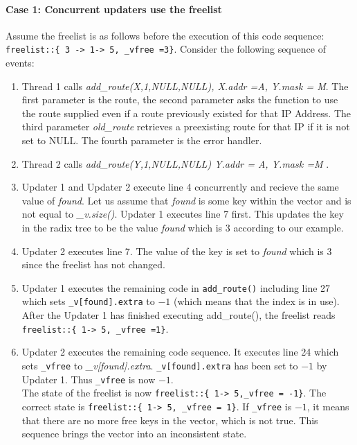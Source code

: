 \documentclass[12pt,a4paper]{article}
\begin{document}
\paragraph{Case 1: Concurrent updaters use the freelist}
Assume the freelist is as follows before the execution of this code sequence:\\
\verb$freelist::{ 3 -> 1-> 5, _vfree =3}$. Consider the following sequence of events:
\begin{enumerate}
\item Thread 1 calls \emph{add\_route(X,1,NULL,NULL), X.addr =A, Y.mask = M}. The first parameter is the route, the second parameter asks the function to use the route supplied even if a route previously existed for that IP Address. The third parameter \emph{old\_route} retrieves a preexisting route for that IP if it is not set to NULL. The fourth parameter is the error handler.
\item Thread 2 calls \emph{add\_route(Y,1,NULL,NULL) Y.addr = A, Y.mask =M} .
\item Updater 1 and Updater 2 execute line 4 concurrently and recieve the same value of \emph{found}. Let us assume that \emph{found} is some key within the vector and is not equal to \emph{\_v.size()}. Updater 1 executes line 7 first. This updates the key in the radix tree to be the value \emph{found} which is $3$ according to our example.
\item Updater 2 executes line 7. The value of the key is set to \emph{found} which is $3$ since the freelist has not changed.
\item Updater 1 executes the remaining code in \verb+add_route()+ including line 27 which sets \verb+_v[found].extra+ to $-1$ (which means that the index is in use). After the Updater 1 has finished executing add\_route(), the freelist reads \verb$freelist::{ 1-> 5, _vfree =1}$.
\item Updater 2 executes the remaining code sequence. It executes line 24 which sets \verb+_vfree+ to \emph{\_v[found].extra}. \verb+_v[found].extra+ has been set to $-1$ by Updater 1. Thus \verb+_vfree+ is now $-1$.\\
The state of the freelist is now \verb$freelist::{ 1-> 5,_vfree = -1}$. The correct state is \verb$freelist::{ 1-> 5, _vfree = 1}$. If \verb+_vfree+ is $-1$, it means that there are no more free keys in the vector, which is not true. This sequence brings the vector into an inconsistent state.
\end{enumerate}
\end{document}
